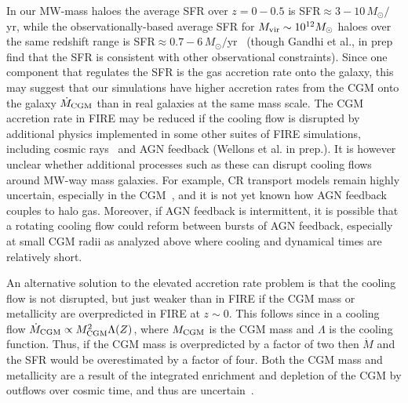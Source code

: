 \documentclass[fleqn,usenatbib]{mnras}
\newcommand{\Mdot}{\dot{M}}
\begin{document}
In our MW-mass haloes the average SFR over $z=0-0.5$ is SFR$\approx 3-10\,M_\odot/$yr, while the observationally-based average SFR for $M_{\rm vir} \sim 10^{12} M_\odot$ haloes over the same redshift range is SFR$\approx 0.7-6\,M_\odot/$yr~\citep{Behroozi2013} (though Gandhi et al., in prep find that the SFR is consistent with other observational constraints).
Since one component that regulates the SFR is the gas accretion rate onto the galaxy, this may suggest that our simulations have higher accretion rates from the CGM onto the galaxy $\Mdot_{\rm CGM}$ than in real galaxies at the same mass scale. 
The CGM accretion rate in FIRE may be reduced if the cooling flow is disrupted by additional physics implemented in some other suites of FIRE simulations, including cosmic rays~\citep{Chan2019, Hopkins2020a, Hopkins2021e, Hopkins2021d} and AGN feedback (Wellons et al. in prep.).
It is however unclear whether additional processes such as these can disrupt cooling flows around MW-way mass galaxies.
For example, CR transport models remain highly uncertain, especially in the CGM~\citep{Hopkins2021, Quataert2021, Quataert2021a}, and it is not yet known how AGN feedback couples to halo gas.
Moreover, if AGN feedback is intermittent, it is possible that a rotating cooling flow could reform between bursts of AGN feedback, especially at small CGM radii as analyzed above where cooling and dynamical times are relatively short. 

An alternative solution to the elevated accretion rate problem is that the cooling flow is not disrupted, but just weaker than in FIRE if the CGM mass or metallicity are overpredicted in FIRE at $z\sim0$.
This follows since in a cooling flow $\Mdot_{\rm CGM}\propto M_{\rm CGM}^2 \Lambda(Z)$, where $M_{\rm CGM}$ is the CGM mass and $\Lambda$ is the cooling function.
Thus, if the CGM mass is overpredicted by a factor of two then $\Mdot$ and the SFR would be overestimated by a factor of four.
Both the CGM mass and metallicity are a result of the integrated enrichment and depletion of the CGM by outflows over cosmic time, and thus are uncertain~\citep[e.g.,][]{Davies2021, Kelly2021}.
\end{document}
